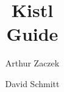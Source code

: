 \documentclass[a4paper,12pt]{report}
\begin{document}
\addtolength{\textheight}{2cm}
\addtolength{\topmargin}{-1cm}

\newenvironment{CS}{\tt\begin{tabbing}\nopagebreak}{\end{tabbing}}
\newcommand{\kw}{\it}
\newcommand{\new}{\bf}
\newcommand{\comment}{\it}

\title{Kistl\\Guide}
\author{Arthur Zaczek}
\author{David Schmitt}

\pagestyle{empty}



\tableofcontents

\setlength{\headheight}{15pt}

\pagestyle{fancy}

\renewcommand{\chaptermark}[1]{\markboth{\chaptername\ \thechapter.\ #1}{}}
\renewcommand{\sectionmark}[1]{\markright{\thesection.\ #1}}

% 
% 
% 







\listoffigures


\end{document}
